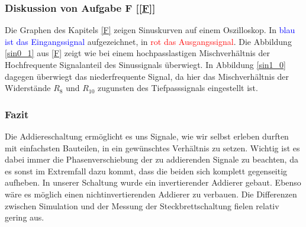 \subsubsection{Diskussion von Aufgabe F [\ref{F}]}
Die Graphen des Kapitels \ref{F} zeigen Sinuskurven auf einem Oszilloskop. In \textcolor{blue}{blau ist das Eingangssignal} aufgezeichnet, in \textcolor{red}{rot das Ausgangssignal}.
Die Abbildung \ref{sin0_1} aus \ref{F} zeigt wie bei einem hochpasslastigen Mischverhältnis der Hochfrequente Signalanteil des Sinussignals überwiegt.
In Abbildung \ref{sin1_0} dagegen überwiegt das niederfrequente Signal, da hier das Mischverhältnis der Widerstände $R_{8}$ und $R_{10}$ zugunsten des Tiefpasssignals eingestellt ist.

\subsubsection{Fazit}
Die Addiereschaltung ermöglicht es uns Signale, wie wir selbst erleben durften mit einfachsten Bauteilen, in ein gewünschtes Verhältnis zu setzen. Wichtig ist es dabei immer die Phasenverschiebung der zu addierenden Signale zu beachten, da es sonst im Extremfall dazu kommt, dass die beiden sich komplett gegenseitig aufheben. In unserer Schaltung wurde ein invertierender Addierer gebaut. Ebenso wäre es möglich einen nichtinvertierenden Addierer zu verbauen. Die Differenzen zwischen Simulation und der Messung der Steckbrettschaltung fielen relativ gering aus.



